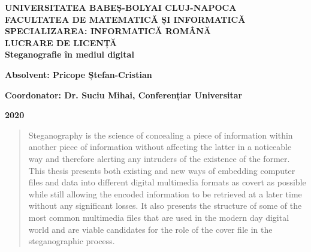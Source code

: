 \documentclass[notitlepage]{report}
\begin{document}
\begin{center}
        \vspace*{1cm}
        
        \LARGE
        \textbf{UNIVERSITATEA BABEȘ-BOLYAI CLUJ-NAPOCA \\ FACULTATEA DE MATEMATICĂ ȘI INFORMATICĂ \\ SPECIALIZAREA: INFORMATICĂ ROMÂNĂ}
        \vspace{1cm}\\

        \vfill
        \LARGE
        \textbf{LUCRARE DE LICENȚĂ} \\
	  \Large
	  \textbf{Steganografie în mediul digital}
        \vspace{1cm}

        
        \vfill
        
        \textbf{Absolvent: Pricope Ștefan-Cristian}
        \vspace{0.1cm}

        \textbf{Coordonator: Dr. Suciu Mihai, Conferențiar Universitar}\\
        \vspace{0.1cm}        

	  \Large
	  \textbf{2020}
        \vspace{1cm}
\end{center}


\clearpage
\begin{abstract}
Steganography is the science of concealing a piece of information within another piece of information without affecting the latter in a noticeable way and therefore alerting any intruders of the existence of the former. 
This thesis presents both existing and new ways of embedding computer files and data into different digital multimedia formats as covert as possible while still allowing the encoded information to be retrieved at a later time without any significant losses. It also       presents the structure of some of the most common multimedia files that are used in the modern day digital world and are viable candidates for the role of the cover file in the steganographic process.
\end{abstract}


\tableofcontents{}






\end{document}
